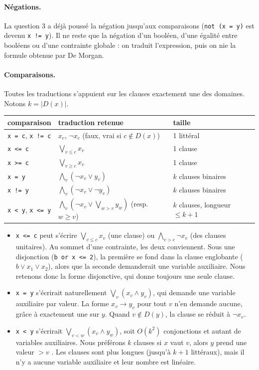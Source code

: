 \documentclass[11pt,a4paper]{article}
\newcommand{\code}[1]{\texttt{#1}}
\begin{document}
\paragraph{Négations.} La question 3 a déjà poussé la négation jusqu'aux comparaisons
(\code{not (x = y)} est devenu \code{x != y}). Il ne reste que la négation d'un booléen, d'une
égalité entre booléens ou d'une contrainte globale : on traduit l'expression, puis on nie la
formule obtenue par De Morgan.

\paragraph{Comparaisons.} Toutes les traductions s'appuient sur les clauses \og exactement
une \fg{} des domaines. Notons $k = |D(x)|$.
\begin{center}
\begin{tabular}{lll}
\toprule
comparaison & traduction retenue & taille \\
\midrule
\code{x = c}, \code{x != c} & $x_c$, $\neg x_c$ (faux, vrai si $c \notin D(x)$) & 1 littéral \\
\code{x <= c} & $\bigvee_{v \le c} x_v$ & 1 clause \\
\code{x >= c} & $\bigvee_{v \ge c} x_v$ & 1 clause \\
\code{x = y} & $\bigwedge_{v} (\neg x_v \vee y_v)$ & $k$ clauses binaires \\
\code{x != y} & $\bigwedge_{v} (\neg x_v \vee \neg y_v)$ & $k$ clauses binaires \\
\code{x < y}, \code{x <= y} & $\bigwedge_{v} (\neg x_v \vee \bigvee_{w > v} y_w)$
  (resp. $w \ge v$) & $k$ clauses, longueur $\le k+1$ \\
\bottomrule
\end{tabular}
\end{center}
\begin{itemize}
  \item \code{x <= c} peut s'écrire $\bigvee_{v\le c} x_v$ (une clause) ou
        $\bigwedge_{v > c}\neg x_v$ (des clauses unitaires). Au sommet d'une contrainte, les
        deux conviennent. Sous une disjonction (\code{b or x <= 2}), la première se fond dans
        la clause englobante ($b \vee x_1 \vee x_2$), alors que la seconde demanderait une
        variable auxiliaire. Nous retenons donc la forme disjonctive, qui donne toujours une
        seule clause.
  \item \code{x = y} s'écrirait naturellement $\bigvee_v (x_v \wedge y_v)$, qui demande une
        variable auxiliaire par valeur. La forme \og $x_v \to y_v$ pour tout $v$ \fg{} n'en
        demande aucune, grâce à \og exactement une \fg{} sur $y$. Quand $v \notin D(y)$, la
        clause se réduit à $\neg x_v$.
  \item \code{x < y} s'écrirait $\bigvee_{v<w}(x_v\wedge y_w)$, soit $O(k^2)$ conjonctions
        et autant de variables auxiliaires. Nous préférons $k$ clauses \og si $x$ vaut $v$,
        alors $y$ prend une valeur $> v$ \fg. Les clauses sont plus longues (jusqu'à $k+1$
        littéraux), mais il n'y a aucune variable auxiliaire et leur nombre est linéaire.
\end{itemize}
\end{document}
